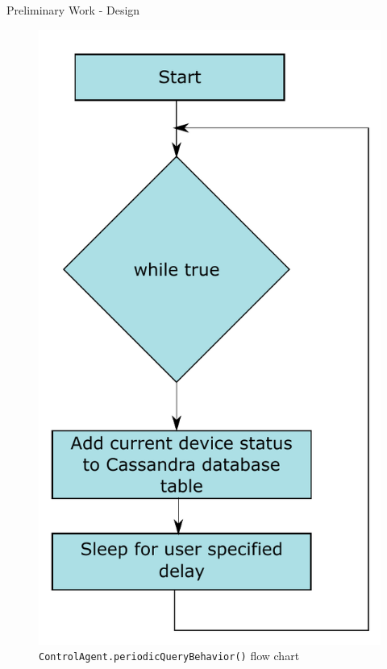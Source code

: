\documentclass{beamer}
\begin{document}
\begin{frame}{Preliminary Work - Design}{}
    \begin{figure}
        \centering
        \includegraphics[scale=0.3]{figs/agents/periodicQueryBehaviorFlow.pdf}
        \caption{\texttt{ControlAgent.periodicQueryBehavior()} flow chart}
        \label{fig:periodicQueryBehavior}
    \end{figure}
\end{frame}
\end{document}
